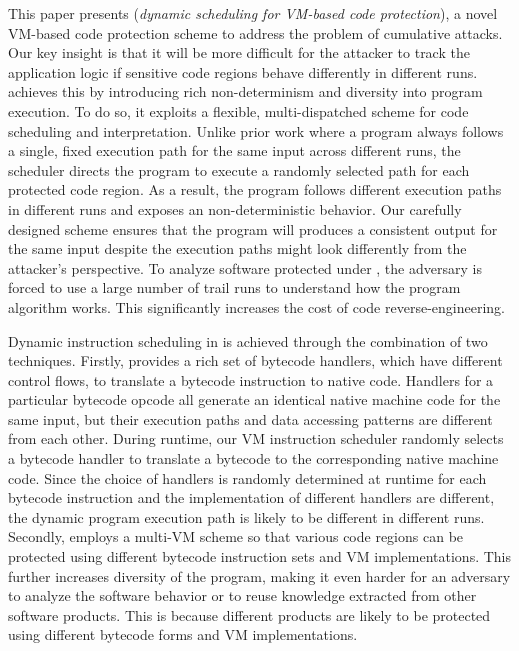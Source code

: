 This paper presents \DSVMP (\emph{dynamic scheduling for VM-based code
protection}), a novel VM-based code protection scheme to address the problem
of cumulative attacks. Our key insight is that it will be more difficult for
the attacker to track the application logic if sensitive code regions behave differently
in different runs. \DSVMP achieves this by introducing rich non-determinism and
diversity into program execution. To do so, it exploits a flexible,
multi-dispatched scheme for code scheduling and interpretation. Unlike prior
work where a program always follows a single, fixed execution path for the
same input across different runs, the \DSVMP scheduler directs the program to
execute a randomly selected path for each protected code region. As a
result, the program follows different execution paths in different runs and
exposes an non-deterministic behavior. Our carefully designed scheme ensures that
the program will produces a consistent output for the same input despite
the execution paths might look differently from the attacker's perspective. To
analyze software protected under \DSVMP, the adversary is forced to use a
large number of trail runs to understand how the program algorithm works.
This significantly increases the cost of code reverse-engineering.


Dynamic instruction scheduling in \DSVMP is achieved through the combination of two techniques.
Firstly, \DSVMP 
provides a rich set of bytecode handlers, which have different control flows, 
to translate a bytecode instruction to native code.
Handlers for a particular bytecode opcode  all generate an identical native machine code for the same input,
but their execution paths and data accessing patterns are different from each other.
During runtime, our VM instruction scheduler randomly selects a  bytecode handler
to translate a bytecode to the corresponding native machine code.
Since the choice of handlers is randomly determined at runtime for each bytecode
instruction and the implementation of different handlers are different,
the dynamic program execution path is likely to be different in different runs.
Secondly, \DSVMP employs a multi-VM scheme so that various code regions
can be protected using different bytecode instruction sets and VM implementations.
This further increases diversity of the program, making it even harder for an adversary to analyze
the software behavior or to reuse knowledge extracted from other software products.
 This is because different products are likely to be protected using different bytecode forms and VM implementations.


